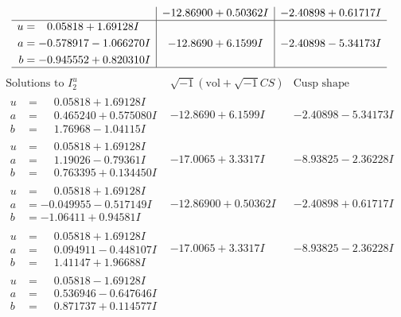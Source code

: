 \documentclass[1p]{elsarticle_modified}
\theoremstyle{definition}
\newcommand{\I}{\sqrt{-1}}
\begin{document}
$$\begin{array}{c|c|c}
 & -12.86900 + 0.50362 I & -2.40898 + 0.61717 I \\ \hline\begin{aligned}
u &= \phantom{-}0.05818 + 1.69128 I \\
a &= -0.578917 - 1.066270 I \\
b &= -0.945552 + 0.820310 I\end{aligned}
 & -12.8690 + 6.1599 I & -2.40898 - 5.34173 I\\
 \hline 
 \end{array}$$\newpage$$\begin{array}{c|c|c}  
\text{Solutions to }I^u_{2}& \I (\text{vol} + \sqrt{-1}CS) & \text{Cusp shape}\\
 \hline 
\begin{aligned}
u &= \phantom{-}0.05818 + 1.69128 I \\
a &= \phantom{-}0.465240 + 0.575080 I \\
b &= \phantom{-}1.76968 - 1.04115 I\end{aligned}
 & -12.8690 + 6.1599 I & -2.40898 - 5.34173 I \\ \hline\begin{aligned}
u &= \phantom{-}0.05818 + 1.69128 I \\
a &= \phantom{-}1.19026 - 0.79361 I \\
b &= \phantom{-}0.763395 + 0.134450 I\end{aligned}
 & -17.0065 + 3.3317 I & -8.93825 - 2.36228 I \\ \hline\begin{aligned}
u &= \phantom{-}0.05818 + 1.69128 I \\
a &= -0.049955 - 0.517149 I \\
b &= -1.06411 + 0.94581 I\end{aligned}
 & -12.86900 + 0.50362 I & -2.40898 + 0.61717 I \\ \hline\begin{aligned}
u &= \phantom{-}0.05818 + 1.69128 I \\
a &= \phantom{-}0.094911 - 0.448107 I \\
b &= \phantom{-}1.41147 + 1.96688 I\end{aligned}
 & -17.0065 + 3.3317 I & -8.93825 - 2.36228 I \\ \hline\begin{aligned}
u &= \phantom{-}0.05818 - 1.69128 I \\
a &= \phantom{-}0.536946 - 0.647646 I \\
b &= \phantom{-}0.871737 + 0.114577 I\end{aligned}

\end{array}$$
\end{document}
